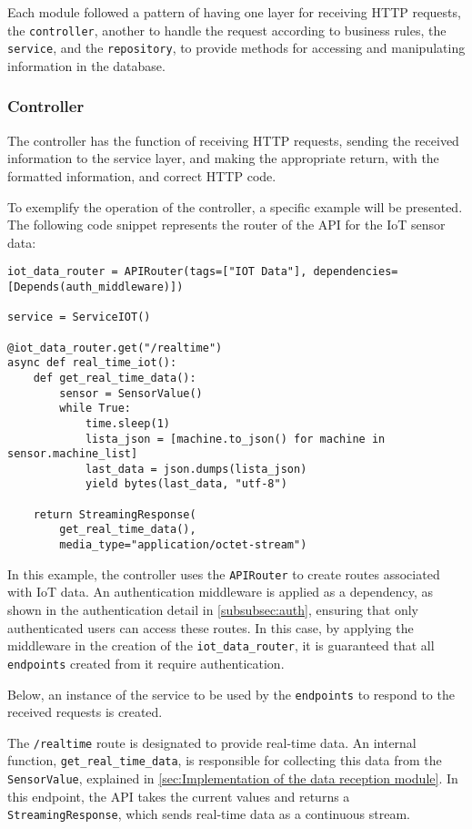 Each module followed a pattern of having one layer for receiving \gls{HTTP} requests, the \texttt{controller}, another to handle the request according to business rules, the \texttt{service}, and the \texttt{repository}, to provide methods for accessing and manipulating information in the database.

\subsubsection{Controller}\label{subsubsec:controller}
The controller has the function of receiving \gls{HTTP} requests, sending the received information to the service layer, and making the appropriate return, with the formatted information, and correct \gls{HTTP} code.

To exemplify the operation of the controller, a specific example will be presented. The following code snippet represents the router of the \gls{API} for the \gls{IoT} sensor data:

\begin{verbatim}
iot_data_router = APIRouter(tags=["IOT Data"], dependencies=[Depends(auth_middleware)])

service = ServiceIOT()

@iot_data_router.get("/realtime")
async def real_time_iot(): 
    def get_real_time_data():
        sensor = SensorValue()
        while True:
            time.sleep(1)
            lista_json = [machine.to_json() for machine in sensor.machine_list]
            last_data = json.dumps(lista_json)
            yield bytes(last_data, "utf-8")

    return StreamingResponse(
        get_real_time_data(),
        media_type="application/octet-stream")
\end{verbatim}

In this example, the controller uses the \texttt{APIRouter} to create routes associated with IoT data. An authentication middleware is applied as a dependency, as shown in the authentication detail in \ref{subsubsec:auth}, ensuring that only authenticated users can access these routes. In this case, by applying the middleware in the creation of the \texttt{iot\_data\_router}, it is guaranteed that all \texttt{endpoints} created from it require authentication.

Below, an instance of the service to be used by the \texttt{endpoints} to respond to the received requests is created.

The \texttt{/realtime} route is designated to provide real-time data. An internal function, \texttt{get\_real\_time\_data}, is responsible for collecting this data from the \texttt{SensorValue}, explained in \ref{sec:Implementation of the data reception module}. In this endpoint, the \gls{API} takes the current values and returns a \texttt{StreamingResponse}, which sends real-time data as a continuous stream.


